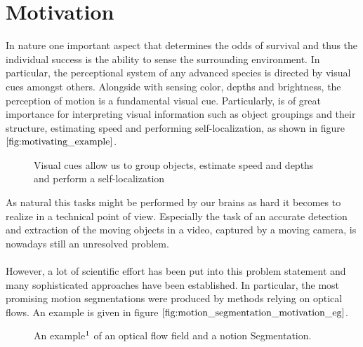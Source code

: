 \section{Motivation}
In nature one important aspect that determines the odds of survival and thus the individual success is the ability to sense the surrounding environment. In particular, the perceptional system of any advanced species is directed by visual cues amongst others. Alongside with sensing color, depths and brightness, the perception of motion is a fundamental visual cue. Particularly, is of great importance for interpreting visual information such as object groupings and their structure, estimating speed and performing self-localization, as shown in figure $\ref{fig:motivating_example}$.
\begin{figure}[H]
\begin{center}
\end{center}
\caption[Motivating Example]{Visual cues allow us to group objects, estimate speed and depths and perform a self-localization}
\label{fig:motivating_example}
\end{figure}
As natural this tasks might be performed by our brains as hard it becomes to realize in a technical point of view. Especially the task of an accurate detection and extraction of the moving objects in a video, captured by a moving camera, is nowadays still an unresolved problem. \\ \\
However, a lot of scientific effort has been put into this problem statement and many sophisticated approaches have been established. In particular, the most promising motion segmentations were produced by methods relying on optical flows. An example is given in figure $\ref{fig:motion_segmentation_motivation_eg}$.
\begin{figure}[H]
\begin{center}
\end{center}
\caption[Motion Segmentation Motivation Example]{An example$\footnotemark$ of an optical flow field and a notion Segmentation. }
\label{fig:motion_segmentation_motivation_eg}
\end{figure}
